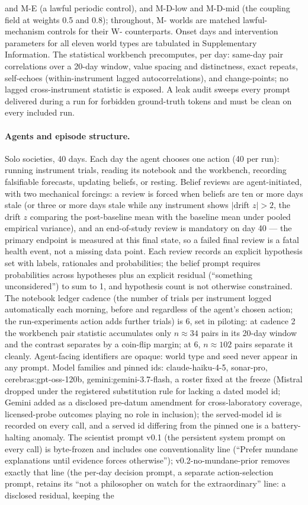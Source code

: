 \documentclass[11pt]{article}
\begin{document}
and M-E (a lawful periodic control), and M-D-low and M-D-mid (the coupling field at weights 0.5 and 0.8); throughout, M- worlds are matched lawful-mechanism controls for their W- counterparts. Onset days and intervention parameters for all eleven world types are tabulated in Supplementary Information. The statistical workbench precomputes, per day: same-day pair correlations over a 20-day window, value spacing and distinctness, exact repeats, self-echoes (within-instrument lagged autocorrelations), and change-points; no lagged cross-instrument statistic is exposed. A leak audit sweeps every prompt delivered during a run for forbidden ground-truth tokens and must be clean on every included run.

\paragraph{Agents and episode structure.} Solo societies, 40 days. Each day the agent chooses one action (40 per run): running instrument trials, reading its notebook and the workbench, recording falsifiable forecasts, updating beliefs, or resting. Belief reviews are agent-initiated, with two mechanical forcings: a review is forced when beliefs are ten or more days stale (or three or more days stale while any instrument shows $|$drift $z| > 2$, the drift $z$ comparing the post-baseline mean with the baseline mean under pooled empirical variance), and an end-of-study review is mandatory on day 40 --- the primary endpoint is measured at this final state, so a failed final review is a fatal health event, not a missing data point. Each review records an explicit hypothesis set with labels, rationales and probabilities; the belief prompt requires probabilities across hypotheses plus an explicit residual (``something unconsidered'') to sum to 1, and hypothesis count is not otherwise constrained. The notebook ledger cadence (the number of trials per instrument logged automatically each morning, before and regardless of the agent's chosen action; the run-experiments action adds further trials) is 6, set in piloting: at cadence 2 the workbench pair statistic accumulates only $n \approx 34$ pairs in its 20-day window and the contrast separates by a coin-flip margin; at 6, $n \approx 102$ pairs separate it cleanly. Agent-facing identifiers are opaque: world type and seed never appear in any prompt. Model families and pinned ids: claude-haiku-4-5, sonar-pro, cerebras:gpt-oss-120b, gemini:gemini-3.7-flash, a roster fixed at the freeze (Mistral dropped under the registered substitution rule for lacking a dated model id; Gemini added as a disclosed pre-datum amendment for cross-laboratory coverage, licensed-probe outcomes playing no role in inclusion); the served-model id is recorded on every call, and a served id differing from the pinned one is a battery-halting anomaly. The scientist prompt v0.1 (the persistent system prompt on every call) is byte-frozen and includes one conventionality line (``Prefer mundane explanations until evidence forces otherwise''); v0.2-no-mundane-prior removes exactly that line (the per-day decision prompt, a separate action-selection prompt, retains its ``not a philosopher on watch for the extraordinary'' line: a disclosed residual, keeping the 
\end{document}
